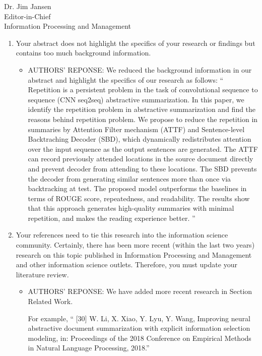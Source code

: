 \documentclass[11pt]{letter} %
\begin{document}
\begin{letter}{Dr. Jim Jansen \\
			Editor-in-Chief  \\
			Information Processing and Management}
		\flushleft
		\begin{enumerate}
			\item Your abstract does not highlight the specifics of your research or findings but contains too much background information.
			\begin{itemize}
				\item[] AUTHORS' REPONSE: We reduced the background information in our abstract and highlight the specifics of our research as follows: 
				``
                Repetition is a persistent problem in the task of convolutional sequence to sequence (CNN seq2seq) abstractive summarization. In this paper, we identify the repetition
                problem in abstractive summarization and find the reasons behind repetition problem.
                We propose to reduce the repetition in summaries by Attention Filter mechanism (ATTF) and Sentence-level Backtraching Decoder (SBD), which dynamically redistributes
                attention over the input sequence as the output sentences are generated. The ATTF
                can record previously attended locations in the source document directly and prevent
                decoder from attending to these locations. The SBD prevents the decoder from generating similar sentences more than once via backtracking at test. The proposed model
                outperforms the baselines in terms of ROUGE score, repeatedness, and readability.
                The results show that this approach generates high-quality summaries with minimal
                repetition, and makes the reading experience better.
                ''
			\end{itemize}
			\item Your references need to tie this research into the information science community. Certainly, there has been more recent (within the last two years) research on this topic published in Information Processing and Management and other information science outlets. Therefore, you must update your literature review. 
			\begin{itemize}
				\item[] AUTHORS' REPONSE: We have added more recent research in Section Related Work.
                 
				 For example,
                 `` [30] W. Li, X. Xiao, Y. Lyu, Y. Wang, Improving neural abstractive document summarization with explicit information selection modeling, in: Proceedings of the
                    2018 Conference on Empirical Methods in Natural Language Processing, 2018.''
				 

\end{itemize}
\end{enumerate}
\end{letter}
\end{document}
